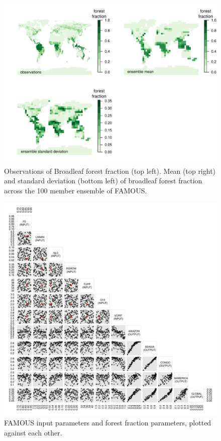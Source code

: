 \documentclass[esd, manuscript]{copernicus}
\begin{document}

\begin{figure}[t]
\includegraphics[width=12cm]{graphics/BL_obs_ensemble_mean_sd.pdf}
\caption{Observations of Broadleaf forest fraction (top left). Mean (top right) and standard deviation (bottom left) of broadleaf forest fraction across the 100 member ensemble of FAMOUS.}
\label{fig:BL_obs_ensemble_mean_sd}
\end{figure}

\begin{figure}[t]
\includegraphics[width=12cm]{graphics/frac_pairs.pdf}
\caption{FAMOUS input parameters and forest fraction parameters, plotted against each other.}
\label{fig:frac_pairs}
\end{figure}
\end{document}
